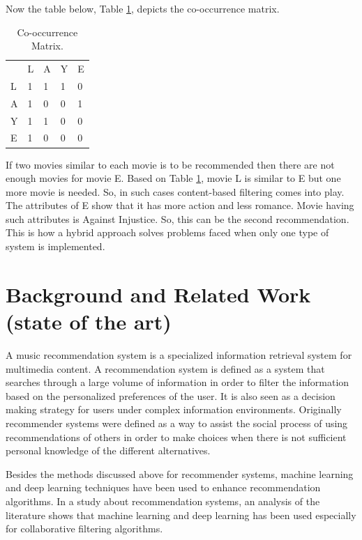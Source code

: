 \documentclass{jot}
\begin{document}
Now the table below, Table \ref{tab:hybrid2}, depicts the co-occurrence matrix.

\begin{table}[h!]
\centering
\begin{tabular}{lllll}
 & L & A & Y & E \\
L     & 1       & 1       & 1         & 0      \\
A     & 1       & 0       & 0         & 1      \\
Y     & 1       & 1       & 0         & 0      \\
E     & 1       & 0       & 0         & 0      \\
\end{tabular}
\caption{Co-occurrence Matrix.}
\label{tab:hybrid2}
\end{table}

If two movies similar to each movie is to be recommended then there are not enough movies for movie E. Based on Table \ref{tab:hybrid2}, movie L is similar to E but one more movie is needed. So, in such cases content-based filtering comes into play. The attributes of E show that it has more action and less romance. Movie having such attributes is Against Injustice. So, this can be the second recommendation. This is how a hybrid approach solves problems faced when only one type of system is implemented.

\section{Background and Related Work (state of the art)}
A music recommendation system is a specialized information retrieval system for multimedia content\cite{chung_kim_2018}. A recommendation system\cite{isinkaye_folajimi_ojokoh_2015} is defined as a system that searches through a large volume of information in order to filter the information based on the personalized preferences of the user. It is also seen as a decision making strategy for users under complex information environments. Originally recommender systems were defined as a way to assist the social process of using recommendations of others in order to make choices when there is not sufficient personal knowledge of the different alternatives\cite{resnick_varian_1997}.

Besides the methods discussed above for recommender systems,  machine learning and deep learning techniques have been used to enhance recommendation algorithms. In a study about recommendation systems\cite{singhal_sinha_pant_2017}, an analysis of the literature shows that machine learning and deep learning has been used especially for collaborative filtering algorithms.
\end{document}
